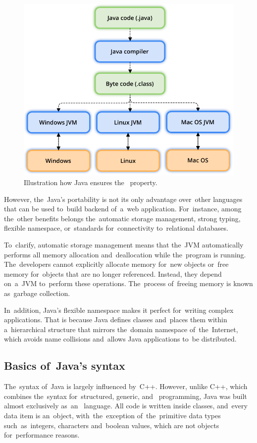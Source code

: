 \begin{figure}[!hbt]
	\centering
	\includegraphics[scale=0.7]{./figures/java-jvm.pdf}
	\caption{Illustration how Java ensures the~
	property.}
	\label{fig-wora}
\end{figure}

However, the~Java's portability is not its only advantage over~other languages
that can be used to~build backend of~a~web application. For~instance, among
the~other benefits belongs the~automatic storage management, strong typing, 
flexible namespace, or~standards for~connectivity to~relational databases.

To~clarify, automatic storage management means that the~JVM automatically
performs all memory allocation and~deallocation while the~program is running.
The~developers cannot explicitly allocate memory for~new objects or~free memory
for~objects that are no longer referenced. Instead, they depend on~a~JVM
to~perform these operations. The~process of~freeing memory is known as~garbage
collection.

In~addition, Java's flexible namespace makes it perfect for~writing complex
applications. That is because Java defines classes and~places them within
a~hierarchical structure that mirrors the~domain namespace of~the~Internet,
which avoids name collisions and~allows Java applications to~be distributed. 



\subsection{Basics of~Java's syntax}
The~syntax of~Java is largely influenced by~C++. However, unlike C++, which
combines the~syntax for~structured, generic, and~
programming, Java was built almost exclusively as~an~
language. All code is written inside classes, and~every data item is an~object,
with~the~exception of~the~primitive data types such~as~integers, characters
and~boolean values, which are not objects for~performance reasons.

